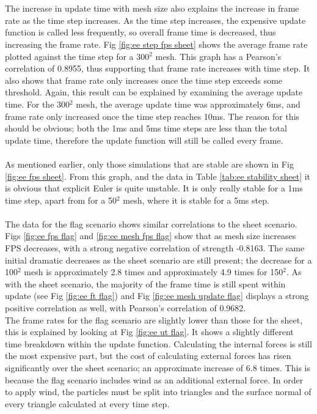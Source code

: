 \\\\The increase in update time with mesh size also explains the increase in frame rate as the time step increases. As the time step increases, the expensive update function is called less frequently, so overall frame time is decreased, thus increasing the frame rate. Fig \ref{fig:ee step fps sheet} shows the average frame rate plotted against the time step for a 300$^{2}$ mesh. This graph has a Pearson's correlation of 0.8955, thus supporting that frame rate increases with time step. It also shows that frame rate only increases once the time step exceeds some threshold. Again, this result can be explained by examining the average update time. For the 300$^{2}$ mesh, the average update time was approximately 6ms, and frame rate only increased once the time step reaches 10ms. The reason for this should be obvious; both the 1ms and 5ms time steps are less than the total update time, therefore the update function will still be called every frame.
\\\\As mentioned earlier, only those simulations that are stable are shown in Fig \ref{fig:ee fps sheet}. From this graph, and the data in Table \ref{tab:ee stability sheet} it is obvious that explicit Euler is quite unstable. It is only really stable for a 1ms time step, apart from for a 50$^{2}$ mesh, where it is stable for a 5ms step.
\\\\The data for the flag scenario shows similar correlations to the sheet scenario. Figs \ref{fig:ee fps flag} and \ref{fig:ee mesh fps flag} show that as mesh size increases FPS decreases, with a strong negative correlation of strength -0.8163. The same initial dramatic decreases as the sheet scenario are still present; the decrease for a 100$^{2}$ mesh is approximately 2.8 times and approximately 4.9 times for 150$^{2}$. As with the sheet scenario, the majority of the frame time is still spent within update (see Fig \ref{fig:ee ft flag}) and Fig \ref{fig:ee mesh update flag} displays a strong positive correlation as well, with Pearson's correlation of 0.9682.
\\The frame rates for the flag scenario are slightly lower than those for the sheet, this is explained by looking at Fig \ref{fig:ee ut flag}. It shows a slightly different time breakdown within the update function. Calculating the internal forces is still the most expensive part, but the cost of calculating external forces has risen significantly over the sheet scenario; an approximate increase of 6.8 times. This is because the flag scenario includes wind as an additional external force. In order to apply wind, the particles must be split into triangles and the surface normal of every triangle calculated at every time step. 
